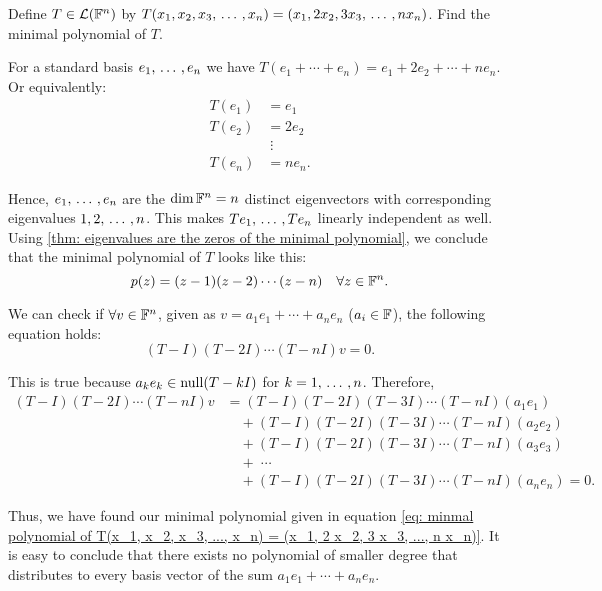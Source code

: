 \begin{xrcs}
  Define $T \in \mathcal{L}(\mathbb{F}^n)$ by $T(x_1, x_2, x_3, {\, \ldots \,\,}, x_n) = (x_1, 2 x_2, 3 x_3, {\, \ldots \,\,},  n x_n)$. Find the minimal polynomial of $T$.

  \begin{xsol}
    For a standard basis $e_1, {\, \ldots \,\,}, e_n$ we have $T( e_1 + \cdots + e_n) = e_1 + 2e_2 + \cdots + n e_n$. Or equivalently:
    \begin{equation}
      \begin{aligned}
        T(e_1) &= e_1  \\
        T(e_2) &= 2e_2 \\
               &\; \vdots \\
        T(e_n) &= n e_n.
      \end{aligned}
    \end{equation}

    Hence, $e_1, {\, \ldots \,\,}, e_n$ are the $\dim \mathbb{F}^n = n$ distinct eigenvectors with corresponding eigenvalues $1, 2,  {\, \ldots \,\,}, n$. This makes $Te_1, {\, \ldots \,\,}, Te_n$ linearly independent as well. Using \ref{thm: eigenvalues are the zeros of the minimal polynomial}, we conclude that the minimal polynomial of $T$ looks like this:
    \begin{equation}
      \label{eq: minmal polynomial of T(x_1, x_2, x_3, ..., x_n) = (x_1, 2 x_2, 3 x_3, ...,  n x_n)}
      p(z) = (z-1)(z-2)\cdots(z-n) \quad \forall z \in \mathbb{F}^n.
    \end{equation}

    We can check if $\forall v \in \mathbb{F}^n$, given as $v = a_1 e_1 + \cdots + a_n e_n$ ($a_i \in \mathbb{F}$), the following equation holds:
    \begin{equation}
      (T-I)(T-2I)\cdots(T-nI)v=0.
    \end{equation}

    This is true because $a_k e_k \in \operatorname{null} (T-kI)$ for $k=1, {\, \ldots \,\,}, n$. Therefore,
    \begin{equation}
      \begin{aligned}
          (T-I)(T-2I)\cdots(T-nI)v & = (T-I)(T-2I)(T-3I)\cdots(T-nI)(a_1 e_1) \\
                                 & \quad + (T-I)(T-2I)(T-3I)\cdots(T-nI)(a_2 e_2) \\
                                 & \quad + (T-I)(T-2I)(T-3I)\cdots(T-nI)(a_3 e_3) \\
                                 & \quad + \; \cdots \\
                                 & \quad + (T-I)(T-2I)(T-3I)\cdots(T-nI)(a_n e_n) = 0.
      \end{aligned}
    \end{equation}

    Thus, we have found our minimal polynomial given in equation \eqref{eq: minmal polynomial of T(x_1, x_2, x_3, ..., x_n) = (x_1, 2 x_2, 3 x_3, ...,  n x_n)}. It is easy to conclude that there exists no polynomial of smaller degree that distributes to every basis vector of the sum $a_1 e_1 + \cdots + a_n e_n$.
  \end{xsol}
\end{xrcs}

